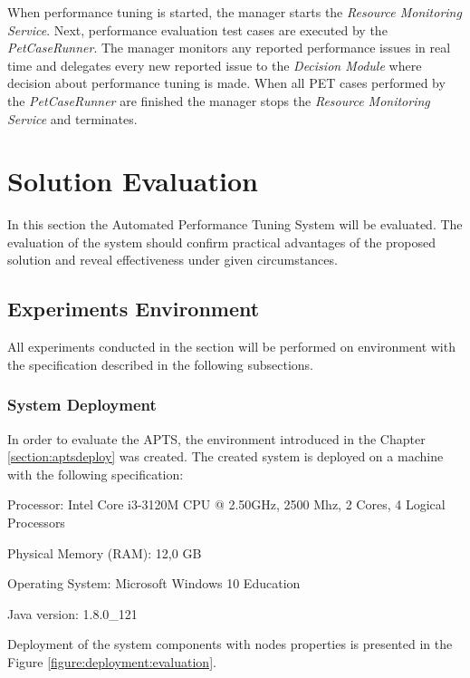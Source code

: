 \documentclass[12pt,a4paper]{article}
\let\tempone\itemize
\let\temptwo\enditemize
\renewenvironment{itemize}{\tempone\addtolength{\itemsep}{-0.4\baselineskip}}{\temptwo}
\begin{document}
When performance tuning is started, the manager starts the \textit{Resource Monitoring Service}. Next, performance evaluation test cases are executed by the \textit{PetCaseRunner}. The manager monitors any reported performance issues in real time and delegates every new reported issue to the \textit{Decision Module} where decision about performance tuning is made. When all PET cases performed by the \textit{PetCaseRunner} are finished the manager stops the \textit{Resource Monitoring Service} and terminates. 

\section{Solution Evaluation}  \label{section:solutionevaluation}

In this section the Automated Performance Tuning System will be evaluated. The evaluation of the system should confirm practical advantages of the proposed solution and reveal effectiveness under given circumstances. 

\subsection{Experiments Environment}

All experiments conducted in the section will be performed on environment with the specification described in the following subsections.

\subsubsection{System Deployment} \label{section:systemdeployment}

In order to evaluate the APTS, the environment introduced in the Chapter \ref{section:aptsdeploy} was created.
The created system is deployed on a machine with the following specification:
\begin{itemize}
\item Processor: Intel Core i3-3120M CPU @ 2.50GHz, 2500 Mhz, 2 Cores, 4 Logical Processors
\item Physical Memory (RAM): 12,0 GB
\item Operating System: Microsoft Windows 10 Education
\item Java version: 1.8.0\_121
\end{itemize}

Deployment of the system components with nodes properties is presented in the Figure \ref{figure:deployment:evaluation}. 
\end{document}

